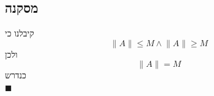 \documentclass[12pt, titlepage]{article}
\begin{document}
\subsection*{מסקנה}
קיבלנו כי
\[
  \lVert A \rVert \leq M \land \lVert A \rVert \geq M
\]
ולכן
\[
  \lVert A \rVert = M
\]
כנדרש\\
$\blacksquare$
\end{document}
